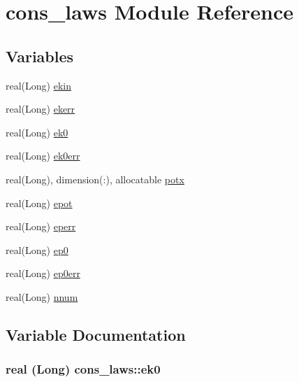 \hypertarget{namespacecons__laws}{
\section{cons\_\-laws Module Reference}
\label{namespacecons__laws}
}
\subsection*{Variables}
\begin{DoxyCompactItemize}
\item 
real(Long) \hyperlink{namespacecons__laws_a8d6ef7d1726b52d17e21c62607c22c3b}{ekin}
\item 
real(Long) \hyperlink{namespacecons__laws_aaaca27b785c52ee051b7f12c73182924}{ekerr}
\item 
real(Long) \hyperlink{namespacecons__laws_a1a3384f3d97911851a7c728ae1cd8af7}{ek0}
\item 
real(Long) \hyperlink{namespacecons__laws_a2d6e39be272e86946cd52d0596c6bc3a}{ek0err}
\item 
real(Long), dimension(:), allocatable \hyperlink{namespacecons__laws_a5e16e552d92dd5dd52c3cdc8600e62fe}{potx}
\item 
real(Long) \hyperlink{namespacecons__laws_a63e2f83fe00d6af9a68267f70281beac}{epot}
\item 
real(Long) \hyperlink{namespacecons__laws_a1fa58c36c9b57ed4261fddafdadfb924}{eperr}
\item 
real(Long) \hyperlink{namespacecons__laws_a1241ed7a0d2ec35982d18efa725fd588}{ep0}
\item 
real(Long) \hyperlink{namespacecons__laws_a9552ba8aaa6ba5048797e3dcabad3eb4}{ep0err}
\item 
real(Long) \hyperlink{namespacecons__laws_ac8202a23f94b9d534dfc7d5169d2e4bf}{nnum}
\end{DoxyCompactItemize}


\subsection{Variable Documentation}
\hypertarget{namespacecons__laws_a1a3384f3d97911851a7c728ae1cd8af7}{
\subsubsection[{ek0}]{\setlength{\rightskip}{0pt plus 5cm}real (Long) {\bf cons\_\-laws::ek0}}}
\label{namespacecons__laws_a1a3384f3d97911851a7c728ae1cd8af7}


